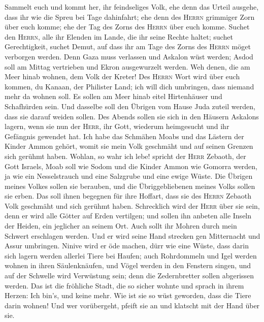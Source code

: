  Sammelt euch und kommt her, ihr feindseliges Volk,
 ehe denn das Urteil ausgehe, dass ihr wie die Spreu bei
Tage dahinfahrt; ehe denn des \textsc{Herrn} grimmiger Zorn über euch
komme; ehe der Tag des Zorns des \textsc{Herrn} über euch komme.
 Suchet den \textsc{Herrn}, alle ihr Elenden im Lande, die
ihr seine Rechte haltet; suchet Gerechtigkeit, suchet Demut, auf dass
ihr am Tage des Zorns des \textsc{Herrn} möget verborgen werden.
 Denn Gaza muss verlassen und Askalon wüst werden; Asdod
soll am Mittag vertrieben und Ekron ausgewurzelt werden. 
Weh denen, die am Meer hinab wohnen, dem Volk der Kreter! Des
\textsc{Herrn} Wort wird über euch kommen, du Kanaan, der Philister
Land; ich will dich umbringen, dass niemand mehr da wohnen soll.
 Es sollen am Meer hinab eitel Hirtenhäuser und
Schafhürden sein.  Und dasselbe soll den Übrigen vom Hause
Juda zuteil werden, dass sie darauf weiden sollen. Des Abends sollen sie
sich in den Häusern Askalons lagern, wenn sie nun der \textsc{Herr}, ihr
Gott, wiederum heimgesucht und ihr Gefängnis gewendet hat.
 Ich habe das Schmähen Moabs und das Lästern der Kinder
Ammon gehört, womit sie mein Volk geschmäht und auf seinen Grenzen sich
gerühmt haben.  Wohlan, so wahr ich lebe! spricht der
\textsc{Herr} Zebaoth, der Gott Israels, Moab soll wie Sodom und die
Kinder Ammon wie Gomorra werden, ja wie ein Nesselstrauch und eine
Salzgrube und eine ewige Wüste. Die Übrigen meines Volkes sollen sie
berauben, und die Übriggebliebenen meines Volks sollen sie erben.
 Das soll ihnen begegnen für ihre Hoffart, dass sie des
\textsc{Herrn} Zebaoth Volk geschmäht und sich gerühmt haben.
 Schrecklich wird der \textsc{Herr} über sie sein, denn
er wird alle Götter auf Erden vertilgen; und sollen ihn anbeten alle
Inseln der Heiden, ein jeglicher an seinem Ort.  Auch
sollt ihr Mohren durch mein Schwert erschlagen werden. 
Und er wird seine Hand strecken gen Mitternacht und Assur umbringen.
Ninive wird er öde machen, dürr wie eine Wüste,  dass
darin sich lagern werden allerlei Tiere bei Haufen; auch Rohrdommeln und
Igel werden wohnen in ihren Säulenknäufen, und Vögel werden in den
Fenstern singen, und auf der Schwelle wird Verwüstung sein; denn die
Zedernbretter sollen abgerissen werden.  Das ist die
fröhliche Stadt, die so sicher wohnte und sprach in ihrem Herzen: Ich
bin's, und keine mehr. Wie ist sie so wüst geworden, dass die Tiere
darin wohnen! Und wer vorübergeht, pfeift sie an und klatscht mit der
Hand über sie.

